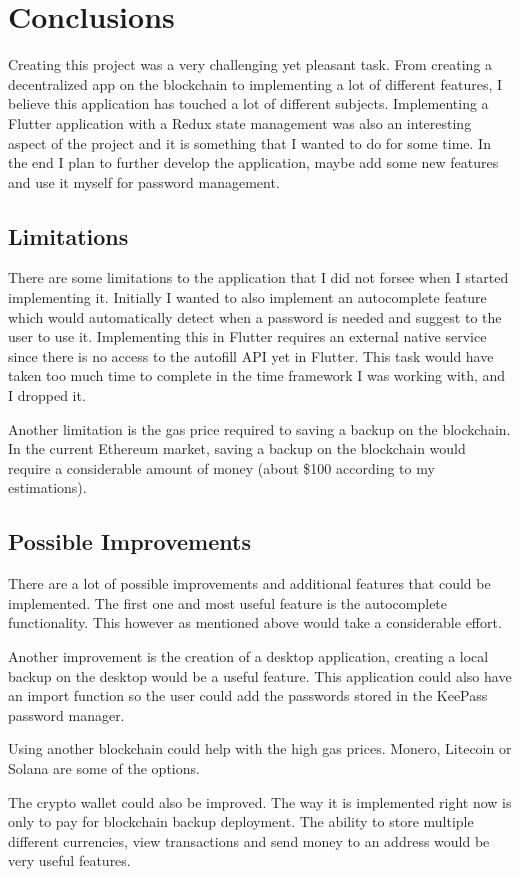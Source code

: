 \documentclass[a4paper,12pt]{report}
\begin{document}
\chapter{Conclusions}

Creating this project was a very challenging yet pleasant task. From creating a
decentralized app on the blockchain to implementing a lot of different
features, I believe this application has touched a lot of different subjects.
Implementing a Flutter application with a Redux state management was also an
interesting aspect of the project and it is something that I wanted to do for
some time. In the end I plan to further develop the application, maybe add some
new features and use it myself for password management.

\section{Limitations}

There are some limitations to the application that I did not forsee when I
started implementing it. Initially I wanted to also implement an autocomplete
feature which would automatically detect when a password is needed and suggest
to the user to use it. Implementing this in Flutter requires an external native
service since there is no access to the autofill API yet in Flutter. This task
would have taken too much time to complete in the time framework I was working
with, and I dropped it.

Another limitation is the gas price required to saving a backup on the
blockchain. In the current Ethereum market, saving a backup on the blockchain
would require a considerable amount of money (about \$100 according to my
estimations).

\section{Possible Improvements}

There are a lot of possible improvements and additional features that could be
implemented. The first one and most useful feature is the autocomplete
functionality. This however as mentioned above would take a considerable
effort.

Another improvement is the creation of a desktop application, creating a local
backup on the desktop would be a useful feature. This application could also
have an import function so the user could add the passwords stored in the
KeePass\cite{keepass} password manager.

Using another blockchain could help with the high gas prices. Monero, Litecoin
or Solana are some of the options.

The crypto wallet could also be improved. The way it is implemented right now
is only to pay for blockchain backup deployment. The ability to store multiple
different currencies, view transactions and send money to an address would be
very useful features.

 
\end{document}
